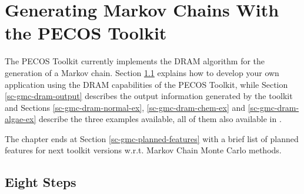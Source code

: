 \chapter{Generating Markov Chains With the PECOS Toolkit}\label{ch-gmc}
\thispagestyle{headings}

The PECOS Toolkit currently implements the DRAM algorithm \cite{HaLaMiSa06} for the generation of a Markov chain.
Section \ref{sc-gmc-eight-steps} explains how to develop your own application using the DRAM capabilities of the PECOS Toolkit, while
Section \ref{sc-gmc-dram-output} describes the output information generated by the toolkit and
Sections
\ref{sc-gmc-dram-normal-ex},
\ref{sc-gmc-dram-chem-ex} and
\ref{sc-gmc-dram-algae-ex}
describe the three examples available,
all of them also available in \cite{mcmctool}.

The chapter ends at Section \ref{sc-gmc-planned-features} with a brief list of planned features for next toolkit versions w.r.t. Markov Chain Monte Carlo methods.

\section{Eight Steps}\label{sc-gmc-eight-steps}

